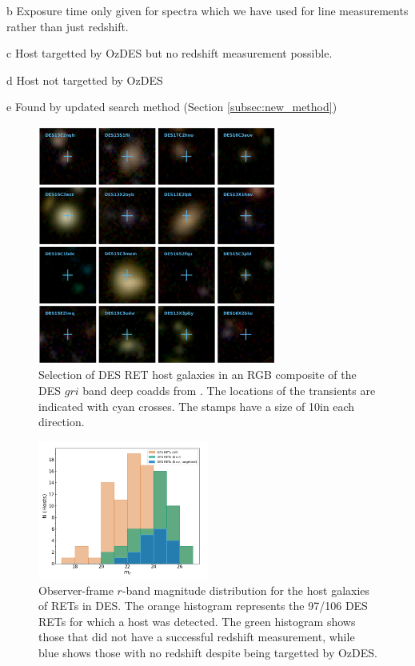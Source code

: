 \documentclass[fleqn,usenatbib,]{mnras}
\begin{document}
\begin{table}
\begin{threeparttable}
\begin{tablenotes}
\item[b] Exposure time only given for spectra which we have used for line measurements rather than just redshift.
\item[c] Host targetted by OzDES but no redshift measurement possible.
\item[d] Host not targetted by OzDES
\item[e] Found by updated search method (Section \ref{subsec:new_method})
\end{tablenotes}
\end{threeparttable}
\label{tab:obs}
\end{table}

\begin{figure}
\includegraphics[width=0.7\textwidth]{figs/RET_Mosaic.png}
\caption{Selection of DES RET host galaxies in an RGB composite of the DES $gri$ band deep coadds from \citet{Wiseman2020}. The locations of the transients are indicated with cyan crosses. The stamps have a size of 10\arcsec in each direction.
\label{fig:mag_dist}}
\end{figure}

\begin{figure}
\includegraphics[width=0.5\textwidth]{figs/mag_dist.png}
\caption{Observer-frame $r$-band magnitude distribution for the host galaxies of RETs in DES. The orange histogram represents the 97/106 DES RETs for which a host was detected. The green histogram shows those that did not have a successful redshift measurement, while blue shows those with no redshift despite being targetted by OzDES.
\label{fig:mag_dist}}
\end{figure}
\end{document}
